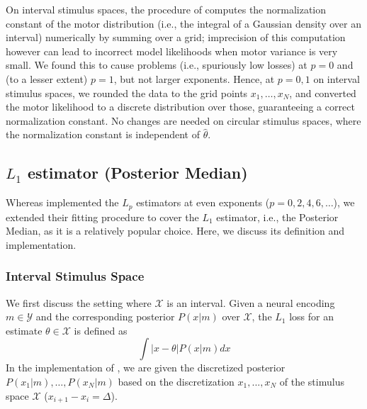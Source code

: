 On interval stimulus spaces, the procedure of \citet{hahn2024unifying} computes the normalization constant of the motor distribution (i.e., the integral of a Gaussian density over an interval) numerically by summing over a grid; imprecision of this computation however can lead to incorrect model likelihoods when motor variance is very small. We found this to cause problems (i.e., spuriously low losses) at $p=0$ and (to a lesser extent) $p=1$, but not larger exponents. Hence, at $p=0,1$ on interval stimulus spaces, we rounded the data to the grid points $x_1, \dots, x_N$, and converted the motor likelihood to a discrete distribution over those, guaranteeing a correct normalization constant. No changes are needed on circular stimulus spaces, where the normalization constant is independent of $\widehat{\theta}$.



\subsection{$L_1$ estimator (Posterior Median)}\label{sec:median}

Whereas \citet{hahn2024unifying} implemented the $L_p$ estimators at even exponents ($p=0,2,4,6,\dots$), we extended their fitting procedure  to cover the $L_1$ estimator, i.e., the Posterior Median, as it is a relatively popular choice.
Here, we discuss its definition and implementation.


\subsubsection*{Interval Stimulus Space}
We first discuss the setting where $\mathcal{X}$ is an interval.
Given a neural encoding $m \in \mathcal{Y}$ and the corresponding posterior $P(x|m)$ over $\mathcal{X}$, the $L_1$ loss for an estimate $\theta \in \mathcal{X}$ is defined as
\begin{equation}\label{eq:l1-loss}
    \int |x-\theta| P(x|m) dx
\end{equation}
In the implementation of \citet{hahn2024unifying}, we are given the discretized posterior $P(x_1|m), \dots, P(x_N|m)$ based on the discretization $x_1, ..., x_N$ of the stimulus space $\mathcal{X}$ ($x_{i+1}-x_i = \Delta$).






